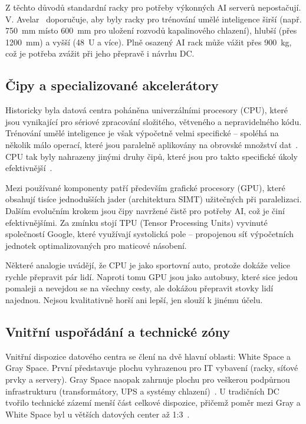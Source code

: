 Z těchto důvodů standardní racky pro potřeby výkonných AI serverů nepostačují. V. Avelar~\cite[s.~13--14]{avelar_ai_2023} doporučuje, aby byly racky pro trénování umělé inteligence širší (např. 750~mm místo 600~mm pro uložení rozvodů kapalinového chlazení), hlubší (přes 1200~mm) a vyšší (48~U a více). Plně osazený AI rack může vážit přes 900~kg, což je potřeba zvážit při jeho přepravě i návrhu DC.

\subsection{Čipy a specializované akcelerátory}
\label{subsec:hardware}

Historicky byla datová centra poháněna univerzálními procesory (CPU), které jsou vynikající pro sériové zpracování složitého, větveného a nepravidelného kódu. Trénování umělé inteligence je však výpočetně velmi specifické -- spoléhá na několik málo operací, které jsou paralelně aplikovány na obrovské množství dat~\cite[s.~133--134]{barroso_data_2026}. CPU tak byly nahrazeny jinými druhy čipů, které jsou pro takto specifické úkoly efektivnější~\cite[s.~1391]{phani_suresh_paladugu_evolution_2025}.

Mezi používané komponenty patří především grafické procesory (GPU), které obsahují tisíce jednodušších jader (architektura SIMT) užitečných při paralelizaci. Dalším evolučním krokem jsou čipy navržené čistě pro potřeby AI, což je činí efektivnějšími. Za zmínku stojí TPU (Tensor Processing Units) vyvinuté společností Google, které využívají systolická pole -- propojenou síť výpočetních jednotek optimalizovaných pro maticové násobení.~\cite[s.~134--139]{barroso_data_2026}

Některé analogie uvádějí, že CPU je jako sportovní auto, protože dokáže velice rychle přepravit pár lidí. Naproti tomu GPU jsou jako autobusy, které sice jedou pomaleji a nevejdou se na všechny cesty, ale dokážou přepravit stovky lidí najednou. Nejsou kvalitativně horší ani lepší, jen slouží k jinému účelu.

\subsection{Vnitřní uspořádání a technické zóny}
\label{subsec:dispozice}

Vnitřní dispozice datového centra se člení na dvě hlavní oblasti: White Space a Gray Space. První představuje plochu vyhrazenou pro IT vybavení (racky, síťové prvky a servery). Gray Space naopak zahrnuje plochu pro veškerou podpůrnou infrastrukturu (transformátory, UPS a systémy chlazení)~\cite[s.~300]{geng_data_2014}. U tradičních DC tvořilo technické zázemí menší část celkové dispozice, přičemž poměr mezi Gray a White Space byl u větších datových center až 1:3~\cite{butler_unlocking_2025}.

